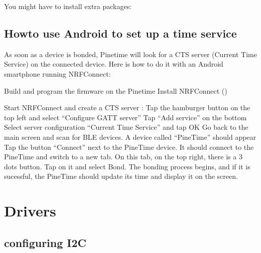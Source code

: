 \documentclass[letterpaper,10pt,english]{sphinxmanual}
\begin{document}
You might have to install extra packages:

\begin{sphinxVerbatim}[commandchars=\\\{\}]
\end{sphinxVerbatim}


\section{Howto use Android to set up a time service}
\label{\detokenize{current-time:howto-use-android-to-set-up-a-time-service}}
As soon as a device is bonded, Pinetime will look for a CTS server (Current Time Service) on the connected device.
Here is how to do it with an Android smartphone running NRFConnect:

Build and program the firmware on the Pinetime Install NRFConnect ()

Start NRFConnect and create a CTS server : Tap the hamburger button on the top left and select “Configure GATT server” Tap “Add service” on the bottom Select server configuration “Current Time Service” and tap OK Go back to the main screen and scan for BLE devices. A device called “PineTime” should appear Tap the button “Connect” next to the PineTime device. It should connect to the PineTime and switch to a new tab. On this tab, on the top right, there is a 3 dots button. Tap on it and select Bond. The bonding process begins, and if it is sucessful, the PineTime should update its time and display it on the screen.


\chapter{Drivers}
\label{\detokenize{drivers/drivers:drivers}}\label{\detokenize{drivers/drivers:id1}}\label{\detokenize{drivers/drivers::doc}}

\section{configuring I2C}
\label{\detokenize{drivers/i2c:configuring-i2c}}\label{\detokenize{drivers/i2c::doc}}
\end{document}
